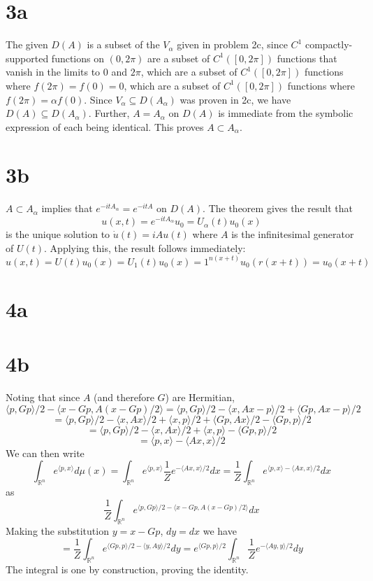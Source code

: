 \documentclass{article}
\begin{document}
\section*{3a}
The given $D(A)$ is a subset of the $V_{\alpha}$ given in problem 2c, since $C^{1}$ compactly-supported functions on $(0,2\pi)$ are a subset
of $C^{1}([0,2\pi])$ functions that vanish in the limits to $0$ and $2\pi$, which are a subset of $C^{1}([0,2\pi])$ functions where
$f(2\pi)=f(0)=0$, which are a subset of $C^{1}([0,2\pi])$ functions where $f(2\pi)=\alpha f(0)$.
Since $V_{\alpha}\subseteq D(A_{\alpha})$ was proven in 2c, we have $D(A)\subseteq D(A_{\alpha})$.
Further, $A=A_{\alpha}$ on $D(A)$ is immediate from the symbolic expression of each being identical.
This proves $A\subset A_{\alpha}$.

\section*{3b}
$A\subset A_{\alpha}$ implies that $e^{-itA_{\alpha}}=e^{-itA}$ on $D(A)$.
The theorem gives the result that
\[
  u(x,t)=e^{-itA_{\alpha}}u_{0}=U_{\alpha}(t)u_{0}(x)
\]
is the unique solution to $\dot{u}(t)=iAu(t)$ where $A$ is the infinitesimal generator of
$U(t)$.
Applying this, the result follows immediately:
\[
  u(x,t) = U(t)u_{0}(x) = U_{1}(t)u_{0}(x)=1^{n(x+t)}u_{0}(r(x+t))=u_{0}(x+t)
\]

\section*{4a}
\section*{4b}
Noting that since $A$ (and therefore $G$) are Hermitian,
\[
  \langle p,Gp \rangle/2-\langle x-Gp,A(x-Gp)/2 \rangle
  =\langle p,Gp  \rangle/2-\langle x,Ax-p \rangle/2+\langle Gp,Ax-p \rangle/2
\]
\[
  =\langle p,Gp \rangle/2 - \langle x,Ax \rangle/2+\langle x,p \rangle/2+\langle Gp,Ax \rangle/2-\langle Gp,p \rangle/2
\]
\[
  =\langle p,Gp \rangle/2-\langle x,Ax\rangle/2+ \langle x,p \rangle - \langle Gp,p \rangle/2
\]
\[
  =\langle p,x \rangle-\langle Ax,x \rangle/2
\]
We can then write
\[
  \int_{\mathbb{R}^{n}}e^{\langle p,x \rangle}d\mu(x)
  =\int_{\mathbb{R}^{n}}e^{\langle p,x \rangle}\frac{1}{Z}e^{-\langle Ax,x \rangle/2}dx
  =\frac{1}{Z}\int_{\mathbb{R}^{n}}e^{\langle p,x \rangle-\langle Ax,x \rangle/2}dx
\]
as
\[
  \frac{1}{Z}\int_{\mathbb{R}^{n}}e^{\langle p,Gp \rangle/2-\langle x-Gp,A(x-Gp)/2 \rangle}dx
\]
Making the substitution $y=x-Gp$, $dy=dx$ we have
\[
  =\frac{1}{Z}\int_{\mathbb{R}^{n}}e^{\langle Gp,p \rangle/2-\langle y,Ay \rangle/2}dy
  =e^{\langle Gp,p \rangle/2}\int_{\mathbb{R}^{n}}\frac{1}{Z}e^{-\langle Ay,y \rangle/2}dy
\]
The integral is one by construction, proving the identity.
\end{document}
